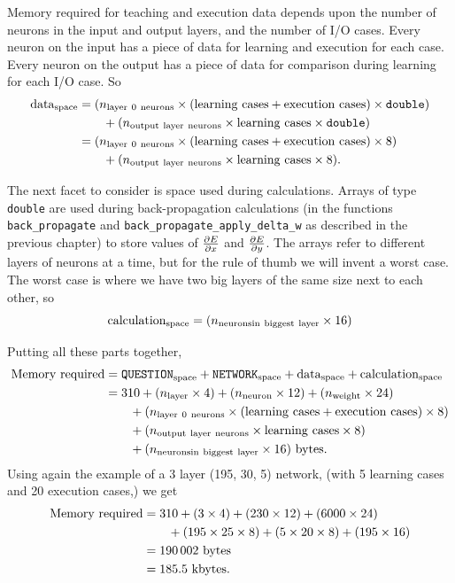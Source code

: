 \documentclass[12pt]{report}
\begin{document}
Memory required for teaching and execution data depends upon
the number of neurons in the input and output layers, and the
number of I/O cases.
Every neuron on the input has a piece of data for learning and execution
for each case.
Every neuron on the output has a piece of data for comparison during learning
for each I/O case.
So
$$
\begin{aligned}
{\rm data}_{\rm space} &= (n_{\rm layer\ 0\ neurons} \times 
	({\rm learning\ cases} + {\rm execution\ cases}) \times 
	\texttt{double})\\
		&\qquad{}+ (n_{\rm output\ layer\ neurons} \times
		{\rm learning\ cases}\times \texttt{double})\\
		       &= (n_{\rm layer\ 0\ neurons} \times 
		({\rm learning\ cases} + {\rm execution\ cases}) \times 8)\\
			&\qquad{}+ (n_{\rm output\ layer\ neurons}\times
				{\rm learning\ cases} \times 8).\\
\end{aligned}
$$

The next facet to consider is space used during calculations.
Arrays of type \texttt{double} are used during back-propagation
calculations (in the functions \texttt{back\-\_propagate} and \texttt{back\-\_propagate\-\_apply\-\_delta\-\_w} as described in the
previous chapter) to store values of $\partial E \over \partial x$
and $\partial E \over \partial y$.
The arrays refer to different layers of neurons at a time, but for
the rule of thumb we will invent a worst case.
The worst case is where we have two big layers of the same size
next to each other, so
$$
{\rm calculation}_{\rm space} = (n_{\rm neurons in\ biggest\ layer}\times 16)
$$

Putting all these parts together, 
$$
\begin{aligned}
{\rm Memory\ required} &= \texttt{QUESTION}_{\rm space} + 
		\texttt{NETWORK}_{\rm space} + {\rm data}_{\rm space}
		+ {\rm calculation}_{\rm space}\\
&= 310 + (n_{\rm layer} \times 4) +
	(n_{\rm neuron} \times 12) + (n_{\rm weight} \times 24)\\
	&\qquad{}+(n_{\rm layer\ 0\ neurons} \times ({\rm learning\ cases}
		+{\rm execution\ cases}) \times 8)\\
	&\qquad{}+(n_{\rm output\ layer\ neurons} \times 
		{\rm learning\ cases} \times 8)\\
	&\qquad{}+(n_{\rm neurons in\ biggest\ layer} \times 16) {\rm\ bytes}.\\
\end{aligned}
$$
Using again the example of a 3 layer (195, 30, 5) network, (with 5 learning
cases and 20 execution cases,) we
get
$$
\begin{aligned}
{\rm Memory\ required} &= 310 + (3 \times 4) + (230 \times 12) + 
			(6000 \times 24)\\
			&\qquad{}+ (195 \times 25 \times 8) +
			(5 \times 20 \times 8) + (195 \times 16)\\
		      &= 190\,002 {\rm\ bytes}\\
		      &= 185.5 {\rm\ kbytes}.
\end{aligned}
$$
\end{document}
